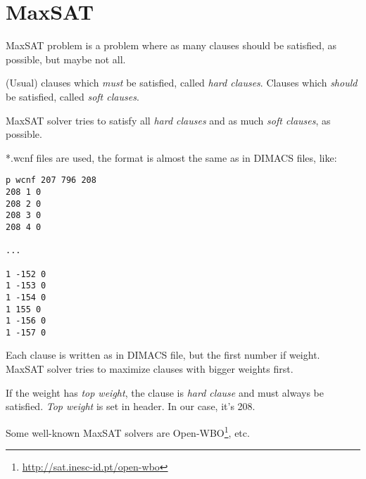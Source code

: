 \section{MaxSAT}

MaxSAT problem is a problem where as many clauses should be satisfied, as possible, but maybe not all.

(Usual) clauses which \textit{must} be satisfied, called \textit{hard clauses}.
Clauses which \textit{should} be satisfied, called \textit{soft clauses}.

MaxSAT solver tries to satisfy all \textit{hard clauses} and as much \textit{soft clauses}, as possible.

*.wcnf files are used, the format is almost the same as in DIMACS files, like:

\begin{lstlisting}
p wcnf 207 796 208
208 1 0
208 2 0
208 3 0
208 4 0

...

1 -152 0
1 -153 0
1 -154 0
1 155 0
1 -156 0
1 -157 0
\end{lstlisting}

Each clause is written as in DIMACS file, but the first number if weight.
MaxSAT solver tries to maximize clauses with bigger weights first.

If the weight has \textit{top weight}, the clause is \textit{hard clause} and must always be satisfied.
\textit{Top weight} is set in header.
In our case, it's 208.

Some well-known MaxSAT solvers are Open-WBO\footnote{\url{http://sat.inesc-id.pt/open-wbo}}, etc.



